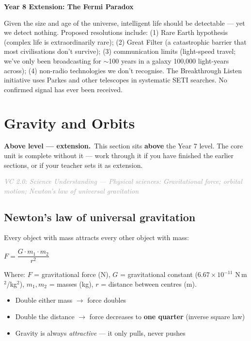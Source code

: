 \documentclass[11pt,a4paper]{article}
\newcommand{\extension}[1]{%
  \begin{extbox}
  {\headingfont\bfseries\color{Violet}Above level --- extension.}\ #1
  \end{extbox}
  \medskip
}
\newcommand{\vc}[2]{\small\textcolor{DarkGrey}{\textit{VC 2.0: #1 --- #2}}}
\begin{document}
\begin{yr8box}
\textbf{Year 8 Extension: The Fermi Paradox}

Given the size and age of the universe, intelligent life should be detectable --- yet we detect nothing. Proposed resolutions include: (1) Rare Earth hypothesis (complex life is extraordinarily rare); (2) Great Filter (a catastrophic barrier that most civilisations don't survive); (3) communication limits (light-speed travel; we've only been broadcasting for $\sim$100 years in a galaxy 100,000 light-years across); (4) non-radio technologies we don't recognise. The Breakthrough Listen initiative uses Parkes and other telescopes in systematic SETI searches. No confirmed signal has ever been received.
\end{yr8box}

\newpage

\newpage
\section[Gravity and Orbits \textnormal{(above level)}]{Gravity and Orbits}\label{sec:9}
\extension{This section sits \textbf{above} the Year 7 level. The core unit
is complete without it --- work through it if you have finished the earlier
sections, or if your teacher sets it as extension.}
\vc{Science Understanding}{Physical sciences: Gravitational force; orbital motion; Newton's law of universal gravitation}

\subsection{Newton's law of universal gravitation}\label{sub:9.1}

Every object with mass attracts every other object with mass:

\begin{center}
\Large $F = \dfrac{G \cdot m_1 \cdot m_2}{r^2}$
\end{center}

Where: $F$ = gravitational force (N), $G$ = gravitational constant ($6.67 \times 10^{-11}$ N\,m$^2$/kg$^2$), $m_1, m_2$ = masses (kg), $r$ = distance between centres (m).

\begin{itemize}
  \item Double either mass $\rightarrow$ force doubles
  \item Double the distance $\rightarrow$ force decreases to \textbf{one quarter} (inverse square law)
  \item Gravity is always \textit{attractive} --- it only pulls, never pushes
\end{itemize}
\end{document}
